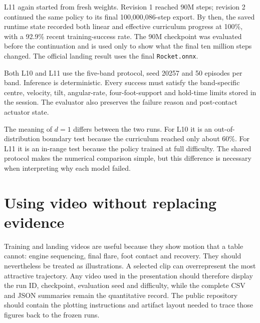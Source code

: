 L11 again started from fresh weights. Revision 1 reached 90M steps; revision 2 continued the
same policy to its final 100,000,086-step export. By then, the saved runtime state recorded both
linear and effective curriculum progress at 100\%, with a 92.9\% recent training-success rate.
The 90M checkpoint was evaluated before the continuation and is used only to show what the final
ten million steps changed. The official landing result uses the final \texttt{Rocket.onnx}.

Both L10 and L11 use the five-band protocol, seed 20257 and 50 episodes per band. Inference is
deterministic. Every success must satisfy the band-specific centre, velocity, tilt, angular-rate,
four-foot-support and hold-time limits stored in the session. The evaluator also preserves the
failure reason and post-contact actuator state.

The meaning of $d=1$ differs between the two runs. For L10 it is an out-of-distribution boundary
test because the curriculum reached only about 60\%. For L11 it is an in-range test because the
policy trained at full difficulty. The shared protocol makes the numerical comparison simple,
but this difference is necessary when interpreting why each model failed.

\section{Using video without replacing evidence}

Training and landing videos are useful because they show motion that a table cannot: engine
sequencing, final flare, foot contact and recovery. They should nevertheless be treated as
illustrations. A selected clip can overrepresent the most attractive trajectory. Any video used
in the presentation should therefore display the run ID, checkpoint, evaluation seed and
difficulty, while the complete CSV and JSON summaries remain the quantitative record. The
public repository should contain the plotting instructions and artifact layout needed to trace
those figures back to the frozen runs.
